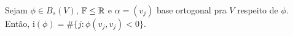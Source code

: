 \begin{theorem}
    Sejam \(\phi \in B_s(V)\), \(\mathbb{F}\leq \mathbb{R}\) e \(\alpha = (v_j)\) base ortogonal pra \(V\) respeito de \(\phi\). Então, i\((\phi) = \#\{j: \phi(v_j,v_j) <0\}\).  
\end{theorem}

